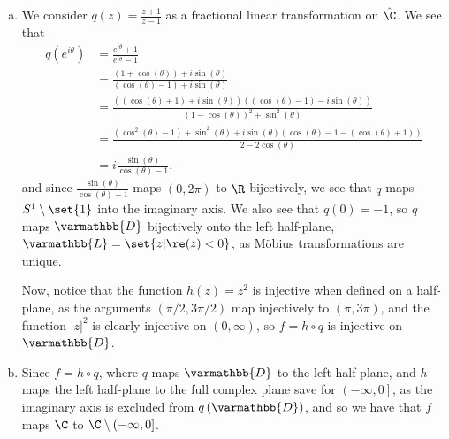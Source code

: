 \documentclass[10pt]{mypackage}
\renewcommand*{\mathbb}[1]{\varmathbb{#1}}
\begin{document}
\begin{solution}\hfill
  \begin{enumerate}[(a)]
    \item We consider $q(z) = \frac{z+1}{z-1}$ as a fractional linear transformation on $\hat{\C}$. We see that
      \begin{align*}
        q\left( e^{i\theta} \right) &= \frac{e^{i\theta} + 1}{e^{i\theta} - 1}\\
                                    &= \frac{\left( 1+\cos\left( \theta \right) \right) + i\sin\left( \theta \right)}{\left( \cos\left( \theta \right) - 1 \right) + i\sin\left( \theta \right)}\\
                                    &= \frac{\left( \left( \cos\left( \theta \right) +1 \right) + i\sin\left( \theta \right) \right)\left( \left( \cos\left( \theta \right)-1 \right) - i\sin\left( \theta \right)  \right)}{\left( 1-\cos\left( \theta \right) \right)^2 + \sin^2\left( \theta \right)}\\
                                    &= \frac{\left( \cos^2\left( \theta \right) - 1 \right) + \sin^2\left( \theta \right) + i\sin\left( \theta \right)\left( \cos\left( \theta \right) - 1 - \left( \cos\left( \theta \right) + 1 \right) \right)}{2-2\cos\left( \theta \right)}\\
                                    &= i\frac{\sin\left( \theta \right)}{\cos\left( \theta \right)-1},
      \end{align*}
      and since $\frac{\sin\left( \theta \right)}{\cos\left( \theta \right)-1}$ maps $(0,2\pi) $ to $ \R$ bijectively, we see that $q$ maps $S^{1}\setminus \set{1}$ into the imaginary axis. We also see that $q(0) = -1$, so $q$ maps $\mathbb{D}$ bijectively onto the left half-plane, $ \mathbb{L} = \set{z | \re(z) < 0} $, as Möbius transformations are unique.\newline

      Now, notice that the function $h(z) = z^2$ is injective when defined on a half-plane, as the arguments $\left( \pi/2,3\pi/2 \right)$ map injectively to $\left( \pi,3\pi \right)$, and the function $\left\vert z \right\vert^2$ is clearly injective on $(0,\infty)$, so $f = h\circ q$ is injective on $ \mathbb{D} $.
    \item Since $f = h\circ q$, where $q$ maps $ \mathbb{D} $ to the left half-plane, and $h$ maps the left half-plane to the full complex plane save for $\left( -\infty,0 \right]$, as the imaginary axis is excluded from $q\left( \mathbb{D} \right)$, and so we have that $f$ maps $\C$ to $\C\setminus (-\infty,0]$.
  \end{enumerate}
\end{solution}
\end{document}
